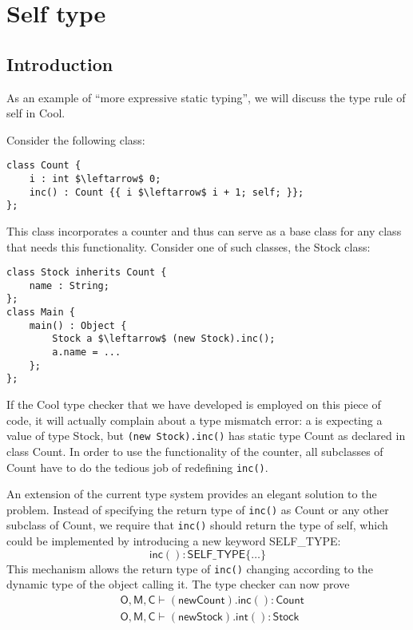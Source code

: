 \section{Self type}
\subsection{Introduction}
As an example of ``more expressive static typing'', we will discuss the type rule of self in Cool.

Consider the following class:
\begin{lstlisting}[mathescape = true]
class Count {
	i : int $\leftarrow$ 0;
	inc() : Count {{ i $\leftarrow$ i + 1; self; }};
};
\end{lstlisting}
This class incorporates a counter and thus can serve as a base class for any class that needs this functionality. Consider one of such classes, the Stock class:
\begin{lstlisting}[mathescape = true]
class Stock inherits Count {
	name : String;
};
class Main {
	main() : Object {
		Stock a $\leftarrow$ (new Stock).inc();
		a.name = ...
	};
};
\end{lstlisting}

If the Cool type checker that we have developed is employed on this piece of code, it will actually complain about a type mismatch error: a is expecting a value of type Stock, but \texttt{(new Stock).inc()} has static type Count as declared in class Count. In order to use the functionality of the counter, all subclasses of Count have to do the tedious job of redefining \texttt{inc()}. 

An extension of the current type system provides an elegant solution to the problem. Instead of specifying the return type of \texttt{inc()} as Count or any other subclass of Count, we require that \texttt{inc()} should return the type of self, which could be implemented by introducing a new keyword SELF\_TYPE:
\begin{equation*}
\mathsf{inc() : SELF\_TYPE \{\dots\}}
\end{equation*}
This mechanism allows the return type of \texttt{inc()} changing according to the dynamic type of the object calling it. The type checker can now prove
\begin{equation*}
\begin{split}
&\mathsf{O,M,C\vdash(new Count).inc() : Count}\\
&\mathsf{O,M,C\vdash(new Stock).int() : Stock}\\
\end{split}
\end{equation*}
